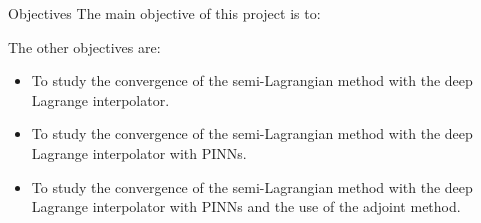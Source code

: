 \begin{frame}{Objectives}
  The main objective of this project is to:

  The other objectives are:
  \begin{itemize}
    \item To study the convergence of the semi-Lagrangian method with the deep Lagrange interpolator.
    \item To study the convergence of the semi-Lagrangian method with the deep Lagrange interpolator with PINNs.
    \item To study the convergence of the semi-Lagrangian method with the deep Lagrange interpolator with PINNs and the use of the adjoint method.
  \end{itemize}

\end{frame}